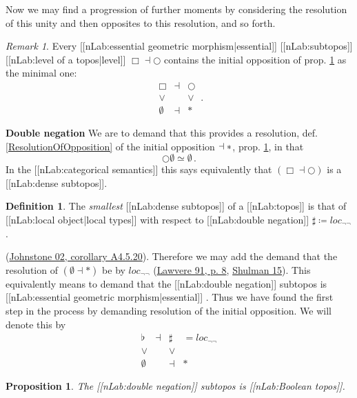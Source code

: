 \documentclass[12pt,titlepage]{article}
\newcommand{\itexarray}[1]{\begin{matrix}#1\end{matrix}}
\theoremstyle{plain}
\newtheorem{prop}{Proposition}
\theoremstyle{definition}
\newtheorem{defn}{Definition}
\theoremstyle{remark}
\newtheorem{remark}{Remark}
\begin{document}
Now we may find a progression of further moments by considering the resolution of this unity and then opposites to this resolution, and so forth.
\begin{remark}
\label{}\hypertarget{}{}
Every [[nLab:essential geometric morphism|essential]] [[nLab:subtopos]] [[nLab:level of a topos|level]] $\Box \dashv \bigcirc$ contains the initial opposition of prop. \ref{InitialOpposition} as the minimal one:
\begin{displaymath}
\itexarray{
     \Box &\dashv& \bigcirc
     \\
     \vee && \vee
     \\
     \emptyset &\dashv& \ast
  }
  \,.
\end{displaymath}
\end{remark}
 \textbf{Double negation}
We are to demand that this provides a resolution, def. \ref{ResolutionOfOpposition} of the initial opposition $\empty \dashv \ast$, prop. \ref{InitialOpposition}, in that
\begin{displaymath}
\bigcirc \emptyset \simeq \emptyset
  \,.
\end{displaymath}
In the [[nLab:categorical semantics]] this says equivalently that $(\Box \dashv \bigcirc)$ is a [[nLab:dense subtopos]].
\begin{defn}
\label{InitialOpposition}\hypertarget{InitialOpposition}{}
The \emph{smallest} [[nLab:dense subtopos]] of a [[nLab:topos]] is that of [[nLab:local object|local types]] with respect to [[nLab:double negation]] $\sharp \coloneqq loc_{\neg \neg}$.
\end{defn}
(\hyperlink{Johnstone02}{Johnstone 02, corollary A4.5.20}).
Therefore we may add the demand that the resolution of $(\emptyset \dashv \ast)$ be by $loc_{\neg \neg}$ (\hyperlink{Lawvere91}{Lawvere 91, p. 8}, \href{}{Shulman 15}). This equivalently means to demand that the [[nLab:double negation]] subtopos is [[nLab:essential geometric morphism|essential]] .
Thus we have found the first step in the process by demanding resolution of the initial opposition. We will denote this by
\begin{displaymath}
\itexarray{
     \flat &\dashv& \sharp & = loc_{\neg \neg}
     \\
     \vee && \vee
     \\
     \emptyset &&\dashv& \ast
  }
\end{displaymath}
\begin{prop}
\label{}\hypertarget{}{}
The [[nLab:double negation]] subtopos is [[nLab:Boolean topos]].
\end{prop}
\end{document}
